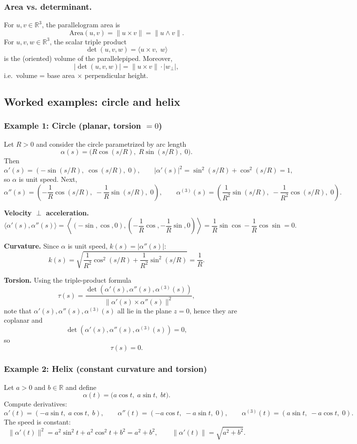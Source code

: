 \documentclass[12pt,a4paper]{article}
\theoremstyle{plain}
\theoremstyle{definition}      %
\begin{document}
	\subsubsection*{Area vs. determinant.}
	For $u,v\in\mathbb{R}^3$, the parallelogram area is
	\[
	\mathrm{Area}(u,v)=\|u\times v\|=\|u\wedge v\|.
	\]
	For $u,v,w\in\mathbb{R}^3$, the scalar triple product
	\[
	\det(u,v,w)=\langle u\times v,\;w\rangle
	\]
	is the (oriented) volume of the parallelepiped. Moreover,
	\[
	|\det(u,v,w)|=\|u\times v\|\cdot |w_\perp|,
	\]
	i.e.\ volume = base area $\times$ perpendicular height.
	
	\subsection*{Worked examples: circle and helix}
	
	\subsubsection*{Example 1: Circle (planar, torsion $=0$)}
	Let $R>0$ and consider the circle parametrized by arc length
	\[
	\alpha(s)=\big(R\cos(s/R),\;R\sin(s/R),\;0\big).
	\]
	Then
	\[
	\alpha'(s)=\left(-\sin(s/R),\;\cos(s/R),\;0\right),
	\qquad
	|\alpha'(s)|^2=\sin^2(s/R)+\cos^2(s/R)=1,
	\]
	so $\alpha$ is unit speed. Next,
	\[
	\alpha''(s)=\left(-\frac{1}{R}\cos(s/R),\;-\frac{1}{R}\sin(s/R),\;0\right),
	\qquad
	\alpha^{(3)}(s)=\left(\frac{1}{R^2}\sin(s/R),\;-\frac{1}{R^2}\cos(s/R),\;0\right).
	\]
	
	\medskip
	\noindent\textbf{Velocity $\perp$ acceleration.}
	\[
	\langle \alpha'(s),\alpha''(s)\rangle
	=
	\left\langle (-\sin,\cos,0),\left(-\frac{1}{R}\cos,-\frac{1}{R}\sin,0\right)\right\rangle
	=
	\frac{1}{R}\sin\cos-\frac{1}{R}\cos\sin=0.
	\]
	
	\medskip
	\noindent\textbf{Curvature.}
	Since $\alpha$ is unit speed, $k(s)=|\alpha''(s)|$:
	\[
	k(s)=\sqrt{\frac{1}{R^2}\cos^2(s/R)+\frac{1}{R^2}\sin^2(s/R)}=\frac{1}{R}.
	\]
	
	\medskip
	\noindent\textbf{Torsion.}
	Using the triple-product formula
	\[
	\tau(s)=\frac{\det(\alpha'(s),\alpha''(s),\alpha^{(3)}(s))}{\|\alpha'(s)\times\alpha''(s)\|^2},
	\]
	note that $\alpha'(s),\alpha''(s),\alpha^{(3)}(s)$ all lie in the plane $z=0$, hence they are coplanar and
	\[
	\det(\alpha'(s),\alpha''(s),\alpha^{(3)}(s))=0,
	\]
	so
	\[
	\tau(s)=0.
	\]
	
	\subsubsection*{Example 2: Helix (constant curvature and torsion)}
	Let $a>0$ and $b\in\mathbb{R}$ and define
	\[
	\alpha(t)=\big(a\cos t,\;a\sin t,\;bt\big).
	\]
	Compute derivatives:
	\[
	\alpha'(t)=(-a\sin t,\;a\cos t,\;b),\qquad
	\alpha''(t)=(-a\cos t,\;-a\sin t,\;0),\qquad
	\alpha^{(3)}(t)=(a\sin t,\;-a\cos t,\;0).
	\]
	The speed is constant:
	\[
	\|\alpha'(t)\|^2=a^2\sin^2 t+a^2\cos^2 t+b^2=a^2+b^2,
	\qquad
	\|\alpha'(t)\|=\sqrt{a^2+b^2}.
	\]
	
\end{document}
